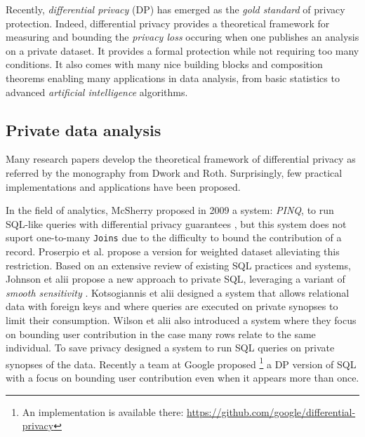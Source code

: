 \documentclass{article}
\theoremstyle{definition}
\begin{document}
Recently, \emph{differential privacy} (DP) \cite{dwork2014} has emerged as the \emph{gold standard} of
privacy protection. Indeed, differential privacy provides a theoretical framework for measuring and bounding
the \emph{privacy loss} occuring when one publishes an analysis on a private dataset.
It provides a formal protection while not requiring too many conditions.
It also comes with many nice building blocks and composition theorems enabling many applications in
data analysis, from basic statistics to advanced \emph{artificial intelligence} algorithms.

\subsection{Private data analysis}

Many research papers develop the theoretical framework of differential privacy as referred by
the monography \cite{dwork2014} from Dwork and Roth. Surprisingly, few practical implementations
and applications have been proposed.

In the field of analytics, McSherry proposed in 2009 a system: \emph{PINQ}, to run SQL-like queries
with differential privacy guarantees \cite{mcsherry2009privacy}, but this system does not suport
one-to-many \verb"Joins" due to the difficulty to bound the contribution of a record.
Proserpio et al. \cite{proserpio2012calibrating} propose a version for weighted dataset alleviating
this restriction.
Based on an extensive review of existing SQL practices and systems, Johnson et alii \cite{johnson2018towards}
propose a new approach to private SQL, leveraging a variant of \emph{smooth sensitivity} \cite{nissim2007smooth}.
Kotsogiannis et alii \cite{kotsogiannis2019privatesql, kotsogiannis2019architecting} designed a system that allows
relational data with foreign keys and where queries are executed on private synopses to limit their consumption.
Wilson et alii also introduced a system \cite{wilson2019differentially} where they focus on bounding user contribution
in the case many rows relate to the same individual.
To save privacy \cite{kotsogiannis2019privatesql, kotsogiannis2019architecting} designed a system to run SQL queries
on private synopses of the data.
Recently a team at Google proposed \footnote{An implementation is available there: \href{https://github.com/google/differential-privacy}{https://github.com/google/differential-privacy}}
a DP version of SQL \cite{wilson2019differentially} with a focus on bounding user contribution even when it appears more than once.
\end{document}
